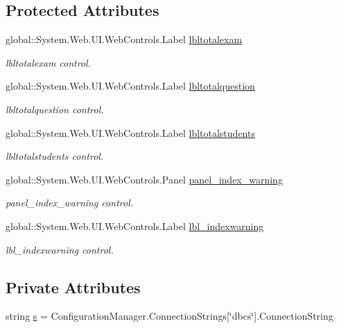 \subsection*{Protected Attributes}
\begin{DoxyCompactItemize}
\item 
global\+::\+System.\+Web.\+U\+I.\+Web\+Controls.\+Label \mbox{\hyperlink{class_admin__index_a95a7c92d6bac34ae125cee9156e569f7}{lbltotalexam}}
\begin{DoxyCompactList}\small\item\em lbltotalexam control. \end{DoxyCompactList}\item 
global\+::\+System.\+Web.\+U\+I.\+Web\+Controls.\+Label \mbox{\hyperlink{class_admin__index_ad7e65082009e2aee0af9bf2514a9323c}{lbltotalquestion}}
\begin{DoxyCompactList}\small\item\em lbltotalquestion control. \end{DoxyCompactList}\item 
global\+::\+System.\+Web.\+U\+I.\+Web\+Controls.\+Label \mbox{\hyperlink{class_admin__index_a42fd08404cbe066afeae670d1f41eb31}{lbltotalstudents}}
\begin{DoxyCompactList}\small\item\em lbltotalstudents control. \end{DoxyCompactList}\item 
global\+::\+System.\+Web.\+U\+I.\+Web\+Controls.\+Panel \mbox{\hyperlink{class_admin__index_a87cb3af0be98046e085bae062b96e1f7}{panel\+\_\+index\+\_\+warning}}
\begin{DoxyCompactList}\small\item\em panel\+\_\+index\+\_\+warning control. \end{DoxyCompactList}\item 
global\+::\+System.\+Web.\+U\+I.\+Web\+Controls.\+Label \mbox{\hyperlink{class_admin__index_a5efbc5fc285148f44deffad3c5352394}{lbl\+\_\+indexwarning}}
\begin{DoxyCompactList}\small\item\em lbl\+\_\+indexwarning control. \end{DoxyCompactList}\end{DoxyCompactItemize}
\subsection*{Private Attributes}
\begin{DoxyCompactItemize}
\item 
string \mbox{\hyperlink{class_admin__index_a40a549f380046e61ebd3c1bb1d6324df}{s}} = Configuration\+Manager.\+Connection\+Strings\mbox{[}\char`\"{}dbcs\char`\"{}\mbox{]}.Connection\+String
\end{DoxyCompactItemize}


